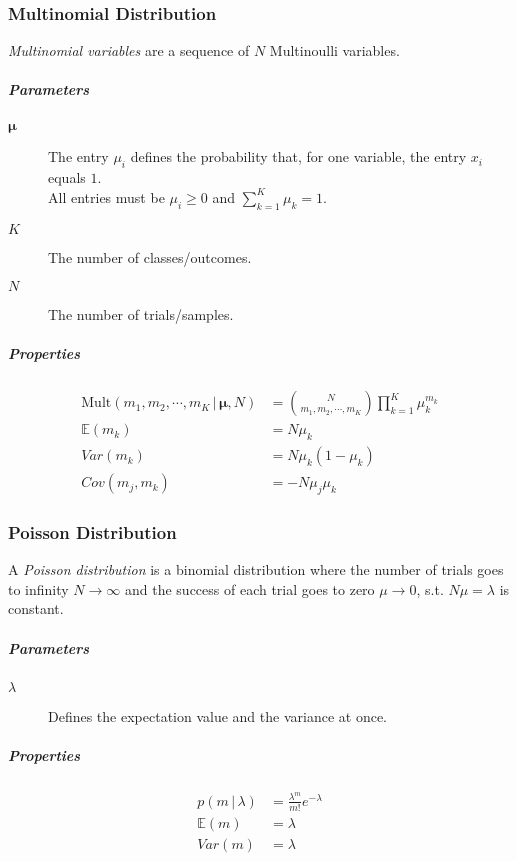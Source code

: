\documentclass[a4paper, 11pt, accentcolor = tud3b]{tudreport}
\newcommand{\E}{\ensuremath{\mathbb{E}}}
\newcommand{\Cov}{\ensuremath{\textit{Cov}}}
\newcommand{\given}{\ensuremath{\,\vert\,}}
\newcommand{\Var}{\ensuremath{\textit{Var}}}
\renewcommand{\vec}[1]{\mathbf{#1}}
\begin{document}
				\subsubsection{Multinomial Distribution}
					\emph{Multinomial variables} are a sequence of \(N\) Multinoulli variables.

					\subparagraph{Parameters}
					\begin{description}
						\item [\(\vec{\mu}\)] The entry \(\mu_i\) defines the probability that, for one variable, the entry \(x_i\) equals \(1\). \\ All entries must be \( \mu_i \geq 0 \) and \( \sum_{k = 1}^{K} \mu_k = 1 \).
						\item [\(K\)] The number of classes/outcomes.
						\item [\(N\)] The number of trials/samples.
					\end{description}

					\subparagraph{Properties}
					\begin{align}
						\textrm{Mult}(m_1, m_2, \cdots, m_K \given \vec{\mu}, N) & = { N \choose m_1, m_2, \cdots, m_K } \prod_{k = 1}^{K} \mu_k^{m_k} \\
						\E(m_k)                                                  & = N\mu_k                                                            \\
						\Var(m_k)                                                & = N\mu_k(1 - \mu_k)                                                 \\
						\Cov(m_j, m_k)                                           & = -N\mu_j\mu_k
					\end{align}

				\subsubsection{Poisson Distribution}
					A \emph{Poisson distribution} is a binomial distribution where the number of trials goes to infinity \( N \to \infty \) and the success of each trial goes to zero \( \mu \to 0 \), s.t. \( N\mu = \lambda \) is constant.

					\subparagraph{Parameters}
					\begin{description}
						\item[\(\lambda\)] Defines the expectation value and the variance at once.
					\end{description}

					\subparagraph{Properties}
					\begin{align}
						p(m \given \lambda) & = \frac{\lambda^m}{m!} e^{-\lambda} \\
						\E(m)               & = \lambda                           \\
						\Var(m)             & = \lambda
					\end{align}
\end{document}
